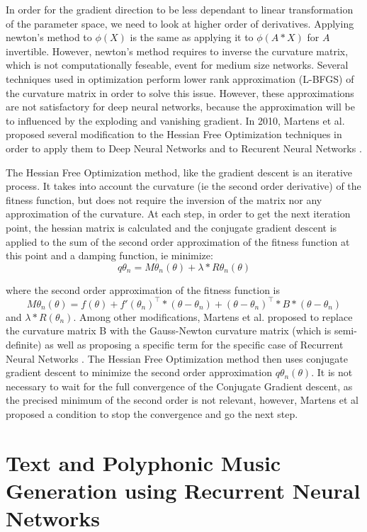 In order for the gradient direction to be less dependant to linear transformation of the parameter space, we need to look at higher order of derivatives. Applying newton's method to $\phi(X)$ is the same as applying it to $\phi(A*X)$ for $A$ invertible. However, newton's method requires to inverse the curvature matrix, which is not computationally feseable, event for medium size networks. Several techniques used in optimization perform lower rank approximation (L-BFGS) of the curvature matrix in order to solve this issue. However, these approximations are not satisfactory for deep neural networks, because the approximation will be to influenced by the exploding and vanishing gradient. In 2010, Martens et al. proposed several modification to the Hessian Free Optimization techniques in order to apply them to Deep Neural Networks \cite{martens2010deep} and to Recurent Neural Networks \cite{martens2011learning}. 

The Hessian Free Optimization method, like the gradient descent is an iterative process. It takes into account the curvature (ie the second order derivative) of the fitness function, but does not require the inversion of the matrix nor any approximation of the curvature. At each step, in order to get the next iteration point, the hessian matrix is calculated and the conjugate gradient descent is applied to the sum of the second order approximation of the fitness function at this point and a damping function, ie minimize:
$$ q\theta_n = M\theta_n(\theta) + \lambda * R\theta_n(\theta) $$

where the second order approximation of the fitness function is $$M\theta_n (\theta) = f(\theta) + f'(\theta_n)^\top * (\theta  - \theta_n)+ (\theta - \theta_n)^\top * B * (\theta - \theta_n) $$ and $\lambda * R(\theta_n)$. Among other modifications, Martens et al. proposed to replace the curvature matrix B with the Gauss-Newton curvature matrix (which is semi-definite) as well as proposing a specific term for the specific case of Recurrent Neural Networks \cite{martens2011learning}.
The Hessian Free Optimization method then uses conjugate gradient descent to minimize the second order approximation $q\theta_n(\theta)$. It is not necessary to wait for the full convergence of the Conjugate Gradient descent, as the precised minimum of the second order is not relevant, however, Martens et al proposed a condition to stop the convergence and go the next step.


\section{Text and Polyphonic Music Generation using Recurrent Neural Networks}

